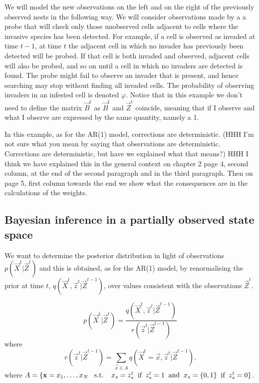 We will model the new observations on the left and on the right of the previously observed nests {\color{blue} in the following way}. We will consider observations made by a a probe that will check only those unobserved cells adjacent to cells where the invasive species has been detected. For example, if a cell is observed as invaded at time $t-1$, at time $t$ the adjacent cell in which no invader has previously been detected will be probed. If that cell is both invaded and observed, adjacent cells will also be probed, and so on until a cell in which no invaders are detected is found. The probe might fail to observe an invader that is present, and hence searching may stop without finding all invaded cells. The probability of observing invaders in an infested cell is denoted $\varphi$. Notice that in this example we don't need to define the matrix $\vec{B}^t$ as $\vec{B}^t$ and $\vec{Z}^t$ coincide, meaning that if I observe and what I observe are expressed by the same quantity, namely a 1.

In this example, as for the AR(1) model, {\color{blue} corrections} are deterministic. {\color{red} (HHH I'm not sure what you mean by saying that observations are deterministic. Corrections are deterministic, but have we explained what that means?)} {\color{blue} HHH I think we have explained this in the general context on chapter 2 page 4, second column, at the end of the second paragraph and in the third paragraph. Then on page 5, first column towards the end we show what the consequences are in the calculations of the weights.}

\subsection{Bayesian inference in a partially observed state space}
\label{sec:8}

We want to determine the posterior distribution in light of observations $p(\vec{X}^{t} | \vec{Z}^{t})$ and this is obtained, as for the AR(1) model, by renormalising the prior at time $t$, $q(\vec{X}^{t}, \vec{z}^{t} | \vec{Z}^{t-1})$, over values consistent with the observations $\vec{Z}^{t}$.

\begin{equation*}
    p(\vec{X}^{t} | \vec{Z}^{t})  =  \frac{q(\vec{X}^{t}, \vec{z}^{t} | \vec{Z}^{t-1})}{r(\vec{z}^{t} | \vec{Z}^{t-1})}
\end{equation*}
where {\color{blue}
\begin{equation*}
    r(\vec{z}^{t} | \vec{Z}^{t-1}) = \sum_{\vec{x}\in A} q(\vec{X}^{t} = \vec{x}, \vec{z}^{t} | \vec{Z}^{t-1}).
\end{equation*}
where $A = \{ \vec{x} = x_1, \dots, x_N \; \text{\: s.t. \: } x_s = z_s^t \text{\: if \:} z_s^t = 1 \text{\: and \:} x_s = \{ 0,1 \} \text{\: if \:} z_s^t = 0 \}$}.

